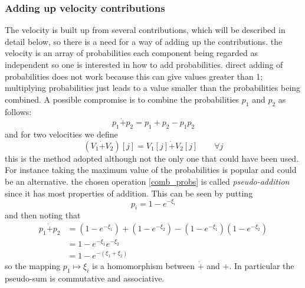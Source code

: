 \documentclass[a4paper,oneside,english]{article}
\numberwithin{equation}{section}
\numberwithin{figure}{section}
\begin{document}
\subsubsection{Adding up velocity contributions}
The velocity is built up from several contributions, which will be described in detail below, so there is a need for a way of adding up the contributions. the velocity is an array of probabilities each component being regarded as independent so one is interested in how to add probabilities. direct adding of probabilities does not work because this can give values greater than 1; multiplying probabilities just leads to a value smaller  than the probabilities being combined. A possible compromise is to combine the probabilities  $p_1$ and $p_2$ as follows:
\begin{equation}\label{comb_probs}
p_1\dot{+}p_2= p_1+p_2-p_1p_2
\end{equation}
and for two velocities we define
\begin{equation}\label{vel-add}
(V_1\dot{+}V_2)[j]=V_1[j]\dot{+}V_2[j] \qquad \forall j
\end{equation}       
this is the method adopted although not the only one that could have been used. For instance taking the maximum value of the probabilities is popular and could be an alternative. the chosen operation \eqref{comb_probs} is called \emph{pseudo-addition} since it has most properties of addition. This can be seen  by putting 
\begin{equation}\label{add-map}
p_i=1-e^{-\xi_i}
\end{equation}
and then noting that
\begin{align}
p_1\dot{+}p_2&=(1-e^{-\xi_1})+(1-e^{-\xi_2})-(1-e^{-\xi_1})(1-e^{-\xi_2})\\
&=1-e^{-\xi_1}e^{-\xi_2}\\
&=1-e^{-(\xi_1+\xi_2)}
\end{align} 
so the mapping $p_1 \mapsto \xi_i$ is a homomorphism between $\dot{+}$ and  $+$. In particular the pseudo-sum is commutative and associative.
\end{document}

